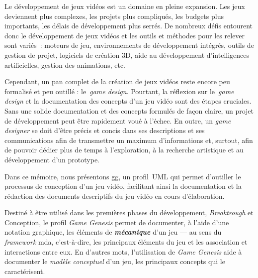 \begin{introduction}



Le développement de jeux vidéos est un domaine en pleine expansion.
%
Les jeux deviennent plus complexes, les projets plus compliqués, les
budgets plus importants, les d\'elais de développement plus serr\'es.
%
De nombreux défis entourent donc le développement de jeux vidéos et
les outils et méthodes pour les relever sont variés~: moteurs de jeu,
environnements de développement intégrés, outils de gestion de projet,
logiciels de création 3D, aide au développement d'intelligences
artificielles, gestion des animations, etc.

Cependant, un pan complet de la création de jeux vidéos reste encore
peu formalisé et peu outillé : le~\emph{game design}.
%
Pourtant, la réflexion sur le~\emph{game design} et la documentation des concepts d'un jeu vidéo sont des étapes cruciales.
%
Sans une solide documentation et des concepts formul\'es de fa\c{c}on claire, un
projet de développement peut être rapidement voué à l'échec.
%
En outre, un \emph{game designer} se doit d'être précis et concis dans ses
descriptions et ses communications afin de transmettre un maximum
d'informations et, surtout, afin de pouvoir dédier plus de temps à l'exploration, à
la recherche artistique et au développement d'un prototype.


Dans ce mémoire, nous présentons \gls{gg}, un profil~UML qui permet d'outiller le processus de conception d'un jeu vidéo, facilitant ainsi la documentation et la rédaction des documents descriptifs du jeu vidéo en cours d'élaboration.

\begin{comment}
\gt{Ci-bas: il vaut mieux ne pas parler <<d'acc\'el\'eration>>, car tu
n'apportes aucune preuve/justification que cela permet d'aller plus
rapidement.}
\end{comment}


%
Destiné à être utilisé dans les premières phases du développement,
\emph{Breaktrough} et Conception, le profil \emph{Game Genesis}
permet de documenter, à l'aide d'une notation graphique, les
\'el\'ements de \emph{\bf mécanique} d'un jeu --- au sens du
\emph{framework} \gls{mda}, c'est-\`a-dire,
les principaux éléments du jeu et les association et interactions
entre eux.
%
En d'autres mots, l'utilisation de \emph{Game Genesis} aide \`a
documenter le \emph{mod\`ele conceptuel} d'un jeu, les principaux
concepts qui le caract\'erisent.



\end{introduction}
